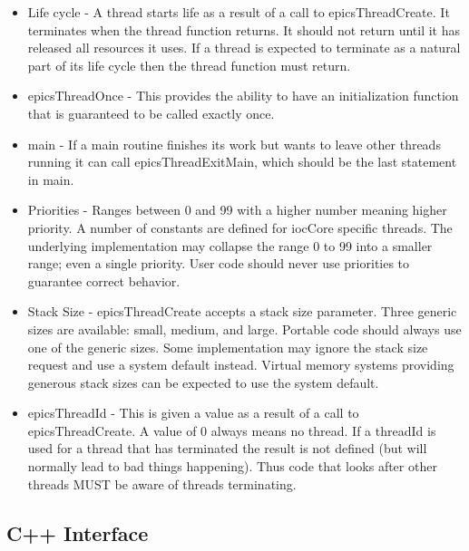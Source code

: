 \begin{itemize}
\item Life cycle - A thread starts life as a result of a call to epicsThreadCreate. It terminates when the thread function 
returns. It should not return until it has released all resources it uses. If a thread is expected to terminate as a natural 
part of its life cycle then the thread function must return.

\item epicsThreadOnce - This provides the ability to have an initialization function that is guaranteed to be called exactly 
once.

\item main - If a main routine finishes its work but wants to leave other threads running it can call epicsThreadExitMain, 
which should be the last statement in main.

\item Priorities - Ranges between 0 and 99 with a higher number meaning higher priority. A number of constants are 
defined for iocCore specific threads. The underlying implementation may collapse the range 0 to 99 into a smaller 
range; even a single priority. User code should never use priorities to guarantee correct behavior.

\item Stack Size - epicsThreadCreate accepts a stack size parameter. Three generic sizes are available: small, medium, 
and large. Portable code should always use one of the generic sizes. Some implementation may ignore the stack 
size request and use a system default instead. Virtual memory systems providing generous stack sizes can be 
expected to use the system default.

\item epicsThreadId - This is given a value as a result of a call to epicsThreadCreate. A value of 0 always means no 
thread. If a threadId is used for a thread that has terminated the result is not defined (but will normally lead to bad 
things happening). Thus code that looks after other threads MUST be aware of threads terminating.

\end{itemize}

\subsection{C++ Interface}

